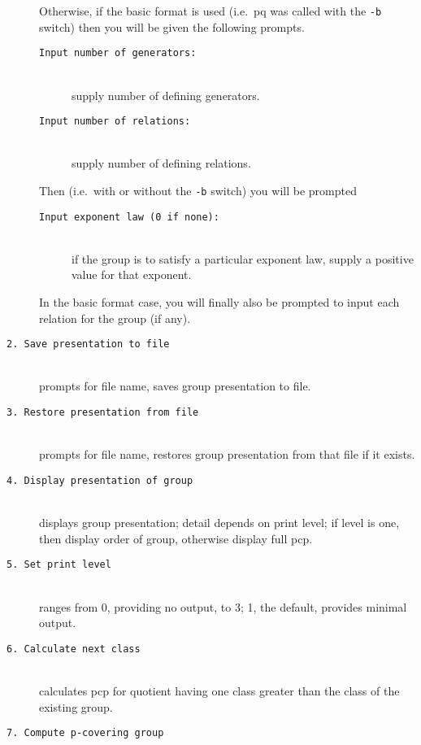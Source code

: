 \documentclass[12pt]{article}
\begin{document}
\begin{description}
\begin{description}
 \end{description}
 Otherwise, if the basic format is used (i.e.\ pq was called with the 
 \texttt{-b} switch) then you will be given the following prompts.
 \begin{description}
 \item[\texttt{Input number of generators:}]\ \\
  supply number of defining generators.
 \item[\texttt{Input number of relations:}]\ \\
  supply number of defining relations.
 \end{description}
 Then (i.e.\ with or without the \texttt{-b} switch) you will be prompted
 \enlargethispage*{1\baselineskip}
 \begin{description}
 \item[\texttt{Input exponent law (0 if none):}]\ \\
  if the group is to satisfy a particular exponent law, supply a positive
  value for that exponent.
 \end{description}
 In the basic format case, you will finally also be prompted to input each 
 relation for the group (if any).

\item[\texttt{2.\ Save presentation to file}]\ \\
 prompts for file name, saves group presentation to file.

\item[\texttt{3.\ Restore presentation from file}]\ \\
 prompts for file name, restores group presentation from that file if it exists.

\item[\texttt{4.\ Display presentation of group}]\ \\
 displays group presentation;
 detail depends on print level; if level is one, then display order
 of group, otherwise display full pcp.

\item[\texttt{5.\ Set print level}]\ \\
 ranges from 0, providing no output, to 3; 
 1, the default, provides minimal output. 

\item[\texttt{6.\ Calculate next class}]\ \\
 calculates pcp for quotient having one class greater than the 
 class of the existing group.

\item[\texttt{7.\ Compute p-covering group}]\ \\


\end{description}
\end{document}
